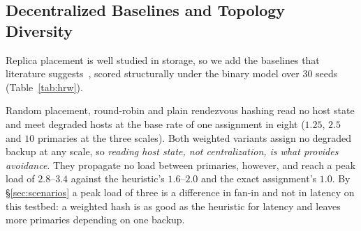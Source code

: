 \subsection{Decentralized Baselines and Topology Diversity}
\label{sec:hrw}

Replica placement is well studied in storage, so we add the baselines that
literature suggests~\cite{weil2006crush,decandia2007dynamo}, scored structurally
under the binary model over 30 seeds
(Table~\ref{tab:hrw}).

\begin{table}[t]
\centering
\caption{Hash-based baselines against the state-aware methods, mean of 30
seeds with the degraded hosts redrawn per seed (\texttt{random} also over 200
draws per seed), binary degradation, structural. ``Deg.'' is the number of primaries
assigned a degraded backup; ``Load'' is the peak number of primaries on one
backup.}
\label{tab:hrw}
\end{table}

Random placement, round-robin and plain rendezvous hashing read no host state
and meet degraded hosts at the base rate of one assignment in eight ($1.25$,
$2.5$ and $10$ primaries at the three scales). Both weighted
variants assign no degraded backup at any scale, so
\emph{reading host state, not centralization, is what provides avoidance}. They
propagate no load between primaries, however, and reach a peak load of
$2.8$--$3.4$ against the heuristic's $1.6$--$2.0$ and the exact assignment's
$1.0$. By \S\ref{sec:scenarios} a peak load of three is a difference in fan-in
and not in latency on this testbed: a weighted hash is as good as the heuristic
for latency and leaves more primaries depending on one backup.

